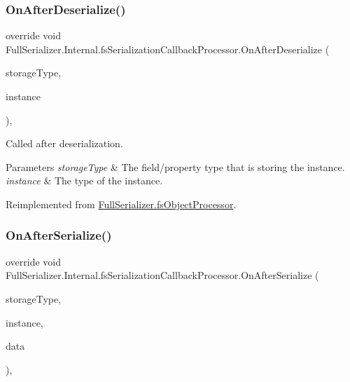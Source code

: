\subsubsection{\texorpdfstring{On\+After\+Deserialize()}{OnAfterDeserialize()}}
{\footnotesize\ttfamily override void Full\+Serializer.\+Internal.\+fs\+Serialization\+Callback\+Processor.\+On\+After\+Deserialize (\begin{DoxyParamCaption}\item[{Type}]{storage\+Type,  }\item[{object}]{instance }\end{DoxyParamCaption})\hspace{0.3cm}{\ttfamily [inline]}, {\ttfamily [virtual]}}



Called after deserialization. 


\begin{DoxyParams}{Parameters}
{\em storage\+Type} & The field/property type that is storing the instance.\\
\hline
{\em instance} & The type of the instance.\\
\hline
\end{DoxyParams}


Reimplemented from \hyperlink{class_full_serializer_1_1fs_object_processor_a147c5f6828b9cf92703152ee7e1611dd}{Full\+Serializer.\+fs\+Object\+Processor}.

\mbox{\label{class_full_serializer_1_1_internal_1_1fs_serialization_callback_processor_aec377284c9f2083c84dfdc75c70e628e}} 
\subsubsection{\texorpdfstring{On\+After\+Serialize()}{OnAfterSerialize()}}
{\footnotesize\ttfamily override void Full\+Serializer.\+Internal.\+fs\+Serialization\+Callback\+Processor.\+On\+After\+Serialize (\begin{DoxyParamCaption}\item[{Type}]{storage\+Type,  }\item[{object}]{instance,  }\item[{ref \hyperlink{class_full_serializer_1_1fs_data}{fs\+Data}}]{data }\end{DoxyParamCaption})\hspace{0.3cm}{\ttfamily [inline]}, {\ttfamily [virtual]}}



